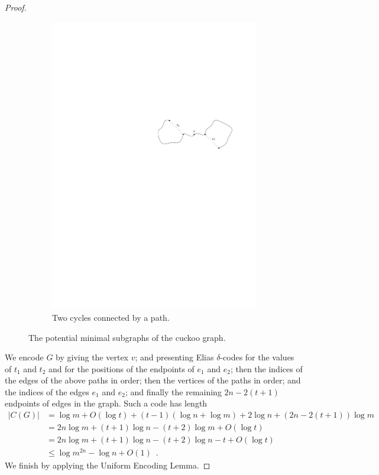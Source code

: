 \documentclass{patmorin}
\begin{document}
\begin{proof}
\begin{figure}
\begin{subfigure}[b]{0.6\textwidth}
      \includegraphics{cuckoo2}
      \caption{Two cycles connected by a path.}
    \end{subfigure}
    \caption{The potential minimal subgraphs of the cuckoo graph.}
  \end{figure}

  We encode $G$ by giving the vertex $v$; and presenting Elias
  $\delta$-codes for the values of $t_1$ and $t_2$ and for the
  positions of the endpoints of $e_1$ and $e_2$; then the indices
  of the edges of
  the above paths in order; then the vertices of the paths in order;
  and the indices of the edges $e_1$ and $e_2$; and finally the 
  remaining $2n - 2(t +
  1)$ endpoints of edges in the graph. Such a code has length
  \begin{align*}
    |C(G)| &= \log m + O(\log t) + (t - 1)(\log n + \log m) + 2\log n + (2n - 2(t + 1))\log m \\
           &= 2n \log m + (t + 1) \log n - (t + 2) \log m + O(\log t) \\
           &= 2n \log m + (t + 1) \log n - (t + 2) \log n - t + O(\log t) \tag{since $m = 2n$} \\
           &\le \log m^{2n} - \log n + O(1) \enspace .
  \end{align*}
  We finish by applying the Uniform Encoding Lemma.
\end{proof}
\end{document}
